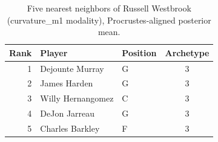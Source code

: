\begin{table}[htbp]
  \centering\small
  \begin{tabular}{rllc}
    \toprule
    Rank & Player & Position & Archetype \\
    \midrule
    1 & Dejounte Murray & G & 3 \\
    2 & James Harden & G & 3 \\
    3 & Willy Hernangomez & C & 3 \\
    4 & DeJon Jarreau & G & 3 \\
    5 & Charles Barkley & F & 3 \\
    \bottomrule
  \end{tabular}
  \caption{Five nearest neighbors of Russell Westbrook (curvature_m1 modality), Procrustes-aligned posterior mean.}
  \label{tab:Russell_Westbrook_neighbors_curvature_m1}
\end{table}

